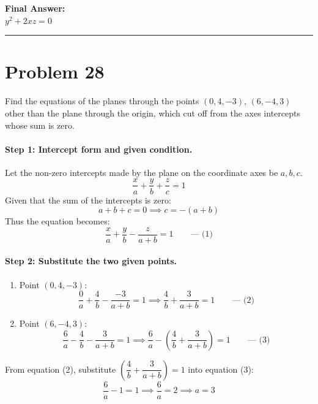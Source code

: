 \documentclass[11pt,a4paper]{article}
\begin{document}
\begin{resultbox}
\textbf{Final Answer:}\\
$\boxed{y^2 + 2xz = 0}$
\end{resultbox}

\vspace{0.4cm}
\hrule
\vspace{0.4cm}

\section{Problem 28}
\begin{problembox}[Problem 28]
Find the equations of the planes through the points $(0, 4, -3), \, (6, -4, 3)$ other than the plane through the origin, which cut off from the axes intercepts whose sum is zero.
\end{problembox}

\paragraph{Step 1: Intercept form and given condition.}
Let the non-zero intercepts made by the plane on the coordinate axes be $a, b, c$.
$$\frac{x}{a} + \frac{y}{b} + \frac{z}{c} = 1$$
Given that the sum of the intercepts is zero:
$$a + b + c = 0 \implies c = -(a + b)$$
Thus the equation becomes:
$$\frac{x}{a} + \frac{y}{b} - \frac{z}{a + b} = 1 \qquad \text{--- (1)}$$

\paragraph{Step 2: Substitute the two given points.}
\begin{enumerate}
    \item Point $(0, 4, -3)$:
    $$\frac{0}{a} + \frac{4}{b} - \frac{-3}{a + b} = 1 \implies \frac{4}{b} + \frac{3}{a + b} = 1 \qquad \text{--- (2)}$$
    \item Point $(6, -4, 3)$:
    $$\frac{6}{a} - \frac{4}{b} - \frac{3}{a + b} = 1 \implies \frac{6}{a} - \left(\frac{4}{b} + \frac{3}{a + b}\right) = 1 \qquad \text{--- (3)}$$
\end{enumerate}
From equation (2), substitute $\left(\dfrac{4}{b} + \dfrac{3}{a + b}\right) = 1$ into equation (3):
$$\frac{6}{a} - 1 = 1 \implies \frac{6}{a} = 2 \implies a = 3$$
\end{document}
